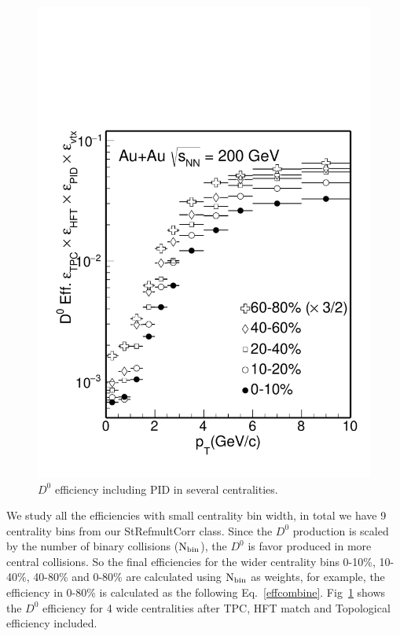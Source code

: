 \begin{figure}[htbp]
\begin{minipage}[htbp]{0.52\linewidth}
\includegraphics[width=1.0\textwidth,angle=0]{figure/Run14_D0HFT/Datad0Eff_10.pdf} 
\caption{ $D^0$ efficiency including PID in several centralities. \label{D0effCombine}}
\end{minipage}
\end{figure}

We study all the efficiencies with small centrality bin width, in total we have 9 centrality bins from our StRefmultCorr class. Since the $D^0$ production is scaled by the number of binary collisions ($\textup{N}_{\textup{bin}}$), the $D^0$ is favor produced in more central collisions. So the final efficiencies for the wider centrality bins 0-10\%, 10-40\%, 40-80\% and 0-80\% are calculated using $\textup{N}_{\textup{bin}}$ as weights, for example, the efficiency in 0-80\% is calculated as the following Eq.~\ref{effcombine}. Fig~\ref{D0effCombine} shows the $D^0$ efficiency for 4 wide centralities after TPC, HFT match and Topological efficiency included.

